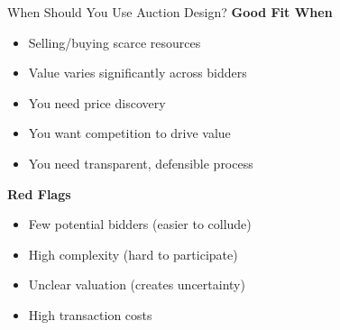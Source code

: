 \documentclass[xcolor={x11names}]{beamer}
\begin{document}
\begin{frame}{When Should You Use Auction Design?}
\textbf{Good Fit When}
\begin{itemize}
  \item Selling/buying scarce resources
  \item Value varies significantly across bidders
  \item You need price discovery
  \item You want competition to drive value
  \item You need transparent, defensible process
\end{itemize}


\textbf{Red Flags}
\begin{itemize}
  \item Few potential bidders (easier to collude)
  \item High complexity (hard to participate)
  \item Unclear valuation (creates uncertainty)
  \item High transaction costs
\end{itemize}
\end{frame}
\end{document}

